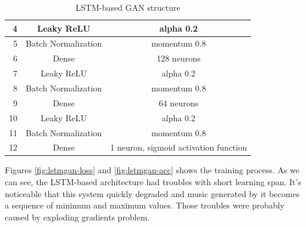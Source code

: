 \documentclass[]{article}
\begin{document}
\begin{table}[]
\begin{tabular}{|r|c|c|}
		4                                    & Leaky ReLU          & alpha 0.2                             \\ \hline
		5                                    & Batch Normalization & momentum 0.8                          \\ \hline
		6                                    & Dense               & 128 neurons                           \\ \hline
		7                                    & Leaky ReLU          & alpha 0.2                             \\ \hline
		8                                    & Batch Normalization & momentum 0.8                          \\ \hline
		9                                    & Dense               & 64 neurons                            \\ \hline
		10                                   & Leaky ReLU          & alpha 0.2                             \\ \hline
		11                                   & Batch Normalization & momentum 0.8                          \\ \hline
		12                                   & Dense               & 1 neuron, sigmoid activation function \\ \hline
	\end{tabular}
	\caption{LSTM-based GAN structure}
	\label{lstm-gan}
\end{table}

Figures \ref{fig:lstmgan-loss} and \ref{fig:lstmgan-acc} shows the training process. As we can see, the LSTM-based architecture had troubles with short learning span. It's noticeable that this system quickly degraded and music generated by it becomes a sequence of minimum and maximum values. Those troubles were probably caused by exploding gradients problem. 
\end{document}
